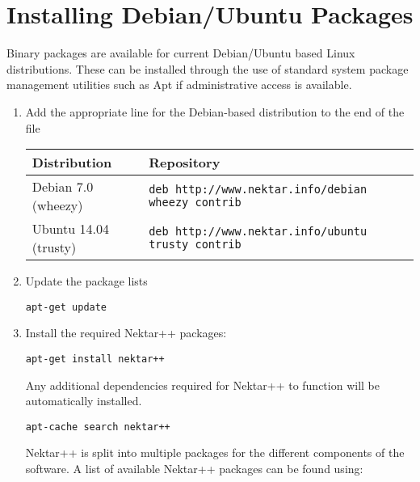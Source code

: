\section{Installing Debian/Ubuntu Packages}
\label{s:installation:debian}
Binary packages are available for current Debian/Ubuntu based Linux
distributions. These can be installed through the use of standard system package
management utilities such as Apt if administrative access is
available.

\begin{enumerate}
	\item Add the appropriate line for the Debian-based distribution to the end of
	the file 
	
	{\small
	\begin{tabular}{ll}
	\toprule
	Distribution & Repository \\
	\midrule
	Debian 7.0 (wheezy) & 
	   \texttt{deb http://www.nektar.info/debian wheezy contrib} \\
	Ubuntu 14.04 (trusty) & 
	   \texttt{deb http://www.nektar.info/ubuntu trusty contrib}\\
	\bottomrule
	\end{tabular}
	}
	\item Update the package lists
	\begin{lstlisting}[style=BashInputStyle]
	apt-get update
	\end{lstlisting}
	\item Install the required Nektar++ packages:
	\begin{lstlisting}[style=BashInputStyle]
	apt-get install nektar++
	\end{lstlisting}
	Any additional dependencies required for Nektar++ to function will be
	automatically installed.
	
    \newsavebox\installationDebTip
    \begin{lrbox}{\installationDebTip}\begin{minipage}{0.8\linewidth}
    \begin{lstlisting}[style=BashInputStyle]
    apt-cache search nektar++
    \end{lstlisting}
    \end{minipage}
    \end{lrbox}
	
	\begin{tipbox}
	Nektar++ is split into multiple packages for the different components of the
	software. A list of available Nektar++ packages can be found using:
	\noindent\usebox\installationDebTip
	\end{tipbox}
\end{enumerate}


